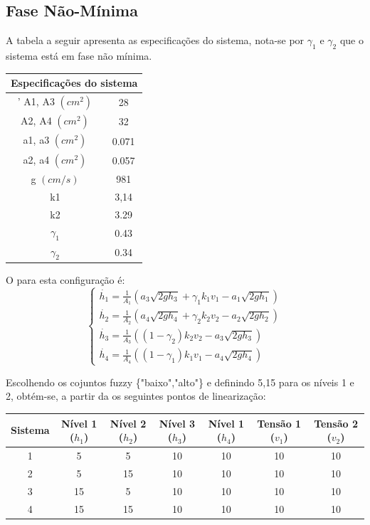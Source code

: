 \subsection{Fase Não-Mínima}
A tabela a seguir apresenta as especificações do sistema, nota-se por $\gamma_1$ e $\gamma_2$ que o sistema está em fase não mínima.
\begin{center}
	\begin{tabular}{|c|c|}
		\hline
		\multicolumn{2}{|c|}{Especificações do sistema} \\
		\hline'
		A1, A3 $(cm^2)$ & 28 \\ \hline
		A2, A4 $(cm^2)$ & 32 \\ \hline
		a1, a3 $(cm^2)$ & 0.071 \\ \hline
		a2, a4 $(cm^2)$ & 0.057 \\ \hline
		g $(cm/s)$ & 981 \\ \hline
		k1 & 3,14 \\ \hline
		k2 & 3.29 \\ \hline
		$\gamma_1$ & 0.43 \\ \hline
		$\gamma_2$ & 0.34 \\ \hline
		\hline
	\end{tabular}
\end{center}

O  para esta configuração é:
\begin{equation}
\begin{cases}
	\dot{h_{1}} = \frac{1}{A_{1}}(a_{3}\sqrt{2gh_{3}} + \gamma_{1}k_{1}v_{1} - a_{1}\sqrt{2gh_{1}})\\
	
	\dot{h_{2}} = \frac{1}{A_{2}}(a_{4}\sqrt{2gh_{4}} + \gamma_{2}k_{2}v_{2} - a_{2}\sqrt{2gh_{2}})\\
	
	\dot{h_{3}} = \frac{1}{A_{3}}((1 - \gamma_{2})k_{2}v_{2} - a_{3}\sqrt{2gh_{3}})\\
	
	\dot{h_{4}} = \frac{1}{A_{4}}((1 - \gamma_{1})k_{1}v_{1} - a_{4}\sqrt{2gh_{4}})
\end{cases}
\label{eqFNMNL}
\end{equation}

Escolhendo os cojuntos fuzzy \{"baixo","alto"\} e definindo {5,15} para os níveis 1 e 2, obtém-se, a partir da os seguintes pontos de linearização:

\begin{center}
	\begin{tabular}{|c|c|c|c|c|c|c|}
		\hline
		Sistema & Nível 1 ($h_1$) & Nível 2 ($h_2$) & Nível 3 ($h_3$) & Nível 1 ($h_4$) & Tensão 1 ($v_1$) & Tensão 2 ($v_2$) \\ \hline
		1 & 5 & 5 & 10 & 10 & 10 & 10 \\ \hline
		2 & 5 & 15 & 10 & 10 & 10 & 10 \\ \hline
		3 & 15 & 5 & 10 & 10 & 10 & 10 \\ \hline
		4 & 15 & 15 & 10 & 10 & 10 & 10 \\	\hline
	\end{tabular}
\end{center}

